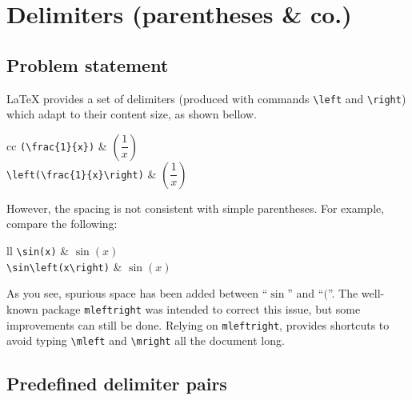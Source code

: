 \documentclass[10pt,a4paper]{article}
\begin{document}
\vfill
\pagebreak
\tableofcontents
\pagebreak


\section{Delimiters (parentheses \& co.)}
\label{sec-delim}

\subsection{Problem statement}
\label{ssec-delim-bug}

{\LaTeX} provides a set of delimiters
(produced with commands \verb|\left| and \verb|\right|)
which adapt to their content size, as shown bellow.
\begin{kdemo*}{c}{c}
\phantom{\tt left}\verb|(\frac{1}{x})|\phantom{\tt right} & $(\dfrac{1}{x})$ \\[2ex]
\verb|\left(\frac{1}{x}\right)| & $\left(\dfrac{1}{x}\right)$ \\
\end{kdemo*}

However, the spacing is not consistent with simple parentheses.
For example, compare the following:\nobreak
\begin{kdemo*}{l}{l}
\verb|\sin(x)| & $\sin(x)$ \\
\verb|\sin\left(x\right)| & $\sin\left(x\right)$ \\
\end{kdemo*}
As you see, spurious space has been added between ``$\sin$'' and ``$($''.
The well-known package \verb|mleftright| was intended to correct this issue, but some improvements can still be done.
Relying on \verb|mleftright|, \kmath provides shortcuts to avoid typing \verb|\mleft| and \verb|\mright| all the document long.


\subsection{Predefined delimiter pairs}
\label{ssec-delim-def}
\end{document}
